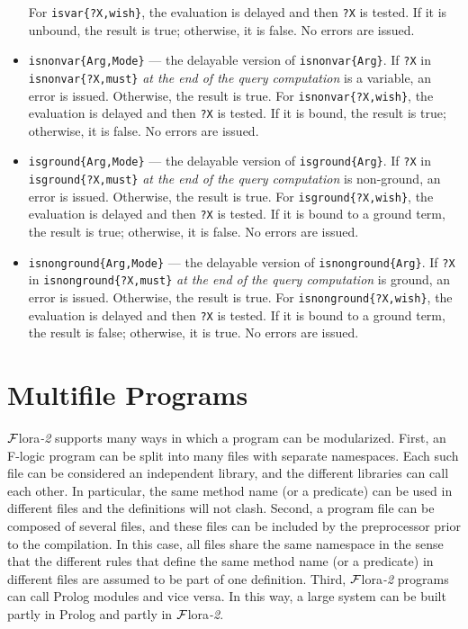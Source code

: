\documentclass[11pt]{article}
\newcommand{\FLSYSTEM}{{\mbox{\sc ${\cal F}${lora}\rm\emph{-2}}}\xspace}
\newcommand{\fl}{\mbox{F-logic}\xspace}
\begin{document}
\begin{itemize}
  For \texttt{isvar\{?X,wish\}}, the
  evaluation is delayed and then \texttt{?X} is tested. If it is unbound,
  the result is true; otherwise, it is false. No errors are issued. 
\item \texttt{isnonvar\{Arg,Mode\}} --- the delayable version of
  \texttt{isnonvar\{Arg\}}.  If \texttt{?X} in
  \texttt{isnonvar\{?X,must\}} \emph{at the end of the query computation} is a
  variable, an error is issued. Otherwise, the result is true.
  For \texttt{isnonvar\{?X,wish\}}, the evaluation is delayed and then
  \texttt{?X} is tested. If it is bound, the result is true; otherwise,
  it is false. No errors are issued.
\item \texttt{isground\{Arg,Mode\}} --- the delayable version of
  \texttt{isground\{Arg\}}.  If \texttt{?X} in
  \texttt{isground\{?X,must\}} \emph{at the end of the query computation}
  is non-ground, an error is issued. Otherwise, the result is true.
  For \texttt{isground\{?X,wish\}}, the
  evaluation is delayed and then \texttt{?X} is tested. If it is bound to a
  ground term, the result is true; otherwise, it is false. No errors are
  issued.
\item \texttt{isnonground\{Arg,Mode\}} --- the delayable version of
  \texttt{isnonground\{Arg\}}.  If \texttt{?X} in
  \texttt{isnonground\{?X,must\}} \emph{at the end of the query computation}
  is ground, an error is issued. Otherwise, the result is true.
  For \texttt{isnonground\{?X,wish\}}, the
  evaluation is delayed and then \texttt{?X} is tested. If it is bound to a
  ground term, the result is false; otherwise, it is true. No errors are
  issued.
\end{itemize}



\section{Multifile Programs}

\FLSYSTEM supports many ways in which a program can be modularized.  First, an
\fl program can be split into many files with separate namespaces. Each
such file can be considered an independent library, and the different
libraries can call each other. In particular, the same method name (or a
predicate) can be used in different files and the definitions will not
clash.  Second, a program file can be composed of several files, and these
files can be included by the preprocessor prior to the compilation. In this
case, all files share the same namespace in the sense that the different
rules that define the same method name (or a predicate) in different files
are assumed to be part of one definition. Third, \FLSYSTEM programs can call
Prolog modules and vice versa. In this way, a large system can be built partly
in Prolog and partly in \FLSYSTEM.
\end{document}
